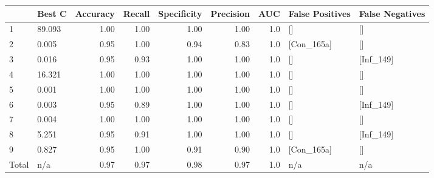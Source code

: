 \begin{tabular}{llrrrrrll}
\toprule
{} &  Best C &  Accuracy &  Recall &  Specificity &  Precision &  AUC & False Positives & False Negatives \\
\midrule
1     &  89.093 &      1.00 &    1.00 &         1.00 &       1.00 &  1.0 &              [] &              [] \\
2     &   0.005 &      0.95 &    1.00 &         0.94 &       0.83 &  1.0 &      [Con\_165a] &              [] \\
3     &   0.016 &      0.95 &    0.93 &         1.00 &       1.00 &  1.0 &              [] &       [Inf\_149] \\
4     &  16.321 &      1.00 &    1.00 &         1.00 &       1.00 &  1.0 &              [] &              [] \\
5     &   0.001 &      1.00 &    1.00 &         1.00 &       1.00 &  1.0 &              [] &              [] \\
6     &   0.003 &      0.95 &    0.89 &         1.00 &       1.00 &  1.0 &              [] &       [Inf\_149] \\
7     &   0.004 &      1.00 &    1.00 &         1.00 &       1.00 &  1.0 &              [] &              [] \\
8     &   5.251 &      0.95 &    0.91 &         1.00 &       1.00 &  1.0 &              [] &       [Inf\_149] \\
9     &   0.827 &      0.95 &    1.00 &         0.91 &       0.90 &  1.0 &      [Con\_165a] &              [] \\
Total &     n/a &      0.97 &    0.97 &         0.98 &       0.97 &  1.0 &             n/a &             n/a \\
\bottomrule
\end{tabular}
